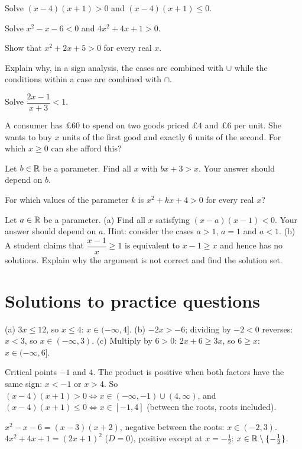 \pq[basic] Solve $(x-4)(x+1)>0$ and $(x-4)(x+1)\le0$.

\pq[mathematical] Solve $x^2-x-6<0$ and $4x^2+4x+1>0$.

\pq[mathematical] Show that $x^2+2x+5>0$ for every real $x$.

\pq[conceptual] Explain why, in a sign analysis, the cases are combined with $\cup$ while the conditions within a
case are combined with $\cap$.

\pq[mathematical] Solve $\dfrac{2x-1}{x+3}<1$.

\pq[application] A consumer has $\pounds 60$ to spend on two goods priced $\pounds 4$ and $\pounds 6$ per unit. She
wants to buy $x$ units of the first good and exactly $6$ units of the second. For which $x\ge0$ can she afford
this?

 Let $b\in\mathbb{R}$ be a parameter. Find all $x$ with $bx+3>x$. Your answer should depend on $b$.

 For which values of the parameter $k$ is $x^2+kx+4>0$ for every real $x$?

 Let $a\in\mathbb{R}$ be a parameter.
(a) Find all $x$ satisfying $(x-a)(x-1)<0$. Your answer should depend on $a$. Hint: consider the cases $a>1$,
$a=1$ and $a<1$.
(b) A student claims that $\dfrac{x-1}{x}\ge1$ is equivalent to $x-1\ge x$ and hence has no solutions. Explain
why the argument is not correct and find the solution set.

\section{Solutions to practice questions}
(a) $3x\le12$, so $x\le4$: $x\in(-\infty,4]$.
(b) $-2x>-6$; dividing by $-2<0$ reverses: $x<3$, so $x\in(-\infty,3)$.
(c) Multiply by $6>0$: $2x+6\ge3x$, so $6\ge x$: $x\in(-\infty,6]$.

Critical points $-1$ and $4$. The product is positive when both factors have the same sign: $x<-1$ or $x>4$. So
$(x-4)(x+1)>0\Leftrightarrow x\in(-\infty,-1)\cup(4,\infty)$, and $(x-4)(x+1)\le0\Leftrightarrow x\in[-1,4]$
(between the roots, roots included).

$x^2-x-6=(x-3)(x+2)$, negative between the roots: $x\in(-2,3)$.
$4x^2+4x+1=(2x+1)^2$ ($D=0$), positive except at $x=-\tfrac12$: $x\in\mathbb{R}\setminus\{-\tfrac12\}$.

